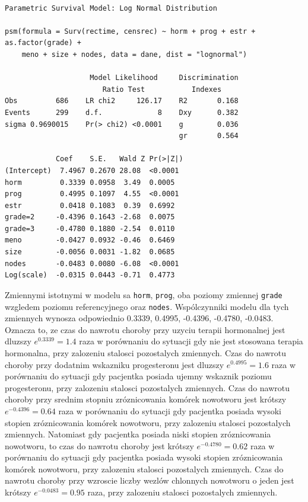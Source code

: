 \documentclass[]{article}
\begin{document}
\begin{verbatim}

Parametric Survival Model: Log Normal Distribution

psm(formula = Surv(rectime, censrec) ~ horm + prog + estr + as.factor(grade) + 
    meno + size + nodes, data = dane, dist = "lognormal")

                    Model Likelihood     Discrimination    
                       Ratio Test           Indexes        
Obs         686    LR chi2     126.17    R2       0.168    
Events      299    d.f.             8    Dxy      0.382    
sigma 0.9690015    Pr(> chi2) <0.0001    g        0.036    
                                         gr       0.564    

            Coef    S.E.   Wald Z Pr(>|Z|)
(Intercept)  7.4967 0.2670 28.08  <0.0001 
horm         0.3339 0.0958  3.49  0.0005  
prog         0.4995 0.1097  4.55  <0.0001 
estr         0.0418 0.1083  0.39  0.6992  
grade=2     -0.4396 0.1643 -2.68  0.0075  
grade=3     -0.4780 0.1880 -2.54  0.0110  
meno        -0.0427 0.0932 -0.46  0.6469  
size        -0.0056 0.0031 -1.82  0.0685  
nodes       -0.0483 0.0080 -6.08  <0.0001 
Log(scale)  -0.0315 0.0443 -0.71  0.4773  
\end{verbatim}

Zmiennymi istotnymi w modelu sa \texttt{horm}, \texttt{prog}, oba
poziomy zmiennej \texttt{grade} wzgledem poziomu referencyjnego oraz
\texttt{nodes}. Wspólczynniki modelu dla tych zmiennych wynosza
odpowiednio 0.3339, 0.4995, -0.4396, -0.4780, -0.0483. Oznacza to, ze
czas do nawrotu choroby przy uzyciu terapii hormonalnej jest dluzszy
\(e^{0.3339} = 1.4\) raza w porównaniu do sytuacji gdy nie jest
stosowana terapia hormonalna, przy zalozeniu stalosci pozostalych
zmiennych. Czas do nawrotu choroby przy dodatnim wskazniku progesteronu
jest dluzszy \(e^{0.4995} = 1.6\) raza w porównaniu do sytuacji gdy
pacjentka posiada ujemny wskaznik poziomu progesteronu, przy zalozeniu
stalosci pozostalych zmiennych. Czas do nawrotu choroby przy srednim
stopniu zróznicowania komórek nowotworu jest krótszy
\(e^{-0.4396} = 0.64\) raza w porównaniu do sytuacji gdy pacjentka
posiada wysoki stopien zróznicowania komórek nowotworu, przy zalozeniu
stalosci pozostalych zmiennych. Natomiast gdy pacjentka posiada niski
stopien zróznicowania nowotworu, to czas do nawrotu choroby jest krótszy
\(e^{-0.4780} = 0.62\) raza w porównaniu do sytuacji gdy pacjentka
posiada wysoki stopien zróznicowania komórek nowotworu, przy zalozeniu
stalosci pozostalych zmiennych. Czas do nawrotu choroby przy wzroscie
liczby wezlów chlonnych  nowotworu o jeden jest
krótszy \(e^{-0.0483} = 0.95\) raza, przy zalozeniu stalosci pozostalych
zmiennych.
\end{document}
